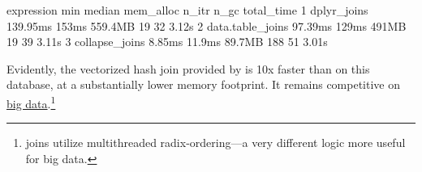 \documentclass[nojss]{jss} %
\begin{document}
%
\begin{Schunk}
\begin{Soutput}
        expression      min  median mem_alloc n_itr n_gc total_time
1      dplyr_joins 139.95ms   153ms   559.4MB    19   32      3.12s
2 data.table_joins  97.39ms   129ms     491MB    19   39      3.11s
3   collapse_joins   8.85ms  11.9ms    89.7MB   188   51      3.01s
\end{Soutput}
\end{Schunk}
%
Evidently, the vectorized hash join provided by  is 10x faster than  on this database, at a substantially lower memory footprint. It remains competitive on \href{https://duckdblabs.github.io/db-benchmark/}{big data}.\footnote{ joins utilize multithreaded radix-ordering---a very different logic more useful for big data.}
\end{document}
